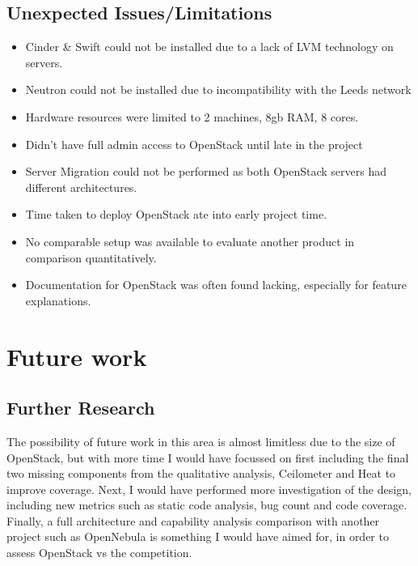 \subsection{Unexpected Issues/Limitations}
\begin{itemize}
\item Cinder \& Swift could not be installed due to a lack of LVM technology on servers.
\item Neutron could not be installed due to incompatibility with the Leeds network
\item Hardware resources were limited to 2 machines, 8gb RAM, 8 cores. 
\item Didn't have full admin access to OpenStack until late in the project
\item Server Migration could not be performed as both OpenStack servers had different architectures. 
\item Time taken to deploy OpenStack ate into early project time.
\item No comparable setup was available to evaluate another product in comparison quantitatively. 
\item Documentation for OpenStack was often found lacking, especially for feature explanations.
\end{itemize}

\section{Future work} 
\subsection{Further Research}


The possibility of future work in this area is almost limitless due to the size of OpenStack, but with more time I would have focussed on first including the final two missing components from the qualitative analysis, Ceilometer and Heat\cite{openstacksoftware} to improve coverage. Next, I would have performed more investigation of the design, including new metrics such as static code analysis, bug count and code coverage. Finally, a full architecture and capability analysis comparison with another project such as OpenNebula is something I would have aimed for, in order to assess OpenStack vs the competition.

